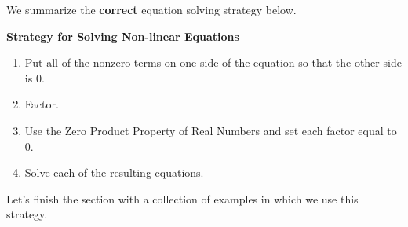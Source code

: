 \documentclass{ximera}
\begin{document}
 

We summarize the {\bf correct} equation solving strategy below.

 

\label{solvenonlineareqns}

\centerline{\textbf{Strategy for Solving Non-linear Equations}}

\begin{enumerate}

\item  Put all of the nonzero terms on one side of the equation so that the other side is $0$.
\item  Factor.
\item  Use the Zero Product Property of Real Numbers and set each factor equal to $0$.
\item  Solve each of the resulting equations.

\end{enumerate}


 

Let's finish the section with a collection of examples in which we use this strategy.
\end{document}
